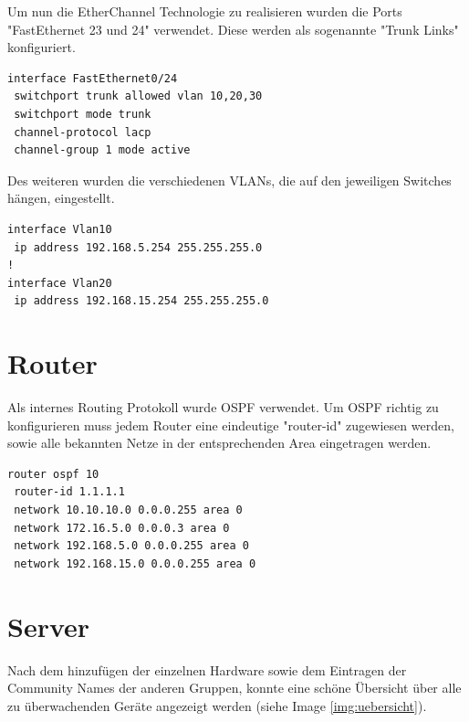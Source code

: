 Um nun die EtherChannel Technologie zu realisieren wurden die Ports "FastEthernet 23 und 24" verwendet. Diese werden als sogenannte "Trunk Links" konfiguriert.

\begin{lstlisting}[caption={Setting EtherChannel on a switch},label={lst:etherchannel},language={}]
interface FastEthernet0/24
 switchport trunk allowed vlan 10,20,30
 switchport mode trunk
 channel-protocol lacp
 channel-group 1 mode active
\end{lstlisting}

Des weiteren wurden die verschiedenen \ac{VLAN}s, die auf den jeweiligen Switches hängen, eingestellt.

\begin{lstlisting}[caption={VLAN Konfiguration auf Switch 1},label={lst:vlan},language={}]
interface Vlan10
 ip address 192.168.5.254 255.255.255.0
!
interface Vlan20
 ip address 192.168.15.254 255.255.255.0

\end{lstlisting}

\section{Router}

Als internes Routing Protokoll wurde \ac{OSPF} verwendet. Um \ac{OSPF} richtig zu konfigurieren muss jedem Router eine eindeutige "router-id" zugewiesen werden, sowie alle bekannten Netze in der entsprechenden Area eingetragen werden.

\begin{lstlisting}[caption={OSPF Konfiguration auf Router 1},label={lst:ospf},language={}]
router ospf 10
 router-id 1.1.1.1
 network 10.10.10.0 0.0.0.255 area 0
 network 172.16.5.0 0.0.0.3 area 0
 network 192.168.5.0 0.0.0.255 area 0
 network 192.168.15.0 0.0.0.255 area 0 
\end{lstlisting}

\section{Server}

Nach dem hinzufügen der einzelnen Hardware sowie dem Eintragen der Community Names der anderen Gruppen, konnte eine schöne Übersicht über alle zu überwachenden Geräte angezeigt werden (siehe Image \ref{img:uebersicht}).

